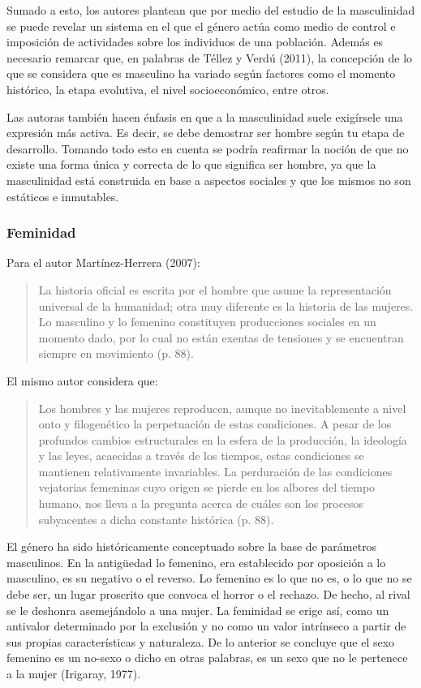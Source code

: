 Sumado a esto, los autores plantean que por medio del estudio de la masculinidad
se puede revelar un sistema en el que el género actúa como medio de control e
imposición de actividades sobre los individuos de una población.
Además es necesario remarcar que, en palabras de Téllez y Verdú (2011), la
concepción de lo que se considera que es masculino ha variado según factores
como el momento histórico, la etapa evolutiva, el nivel socioeconómico, entre
otros.

Las autoras también hacen énfasis en que a la masculinidad suele exigírsele una
expresión más activa.
Es decir, se debe demostrar ser hombre según tu etapa de desarrollo.
Tomando todo esto en cuenta se podría reafirmar la noción de que no existe una
forma única y correcta de lo que significa ser hombre, ya que la masculinidad
está construida en base a aspectos sociales y que los mismos no son estáticos e
inmutables.

\subsubsection{Feminidad}
Para el autor Martínez-Herrera (2007):

\begin{quote}
    La historia oficial es escrita por el hombre que asume la representación
    universal de la humanidad;
    otra muy diferente es la historia de las mujeres.
    Lo masculino y lo femenino constituyen producciones sociales en un momento dado,
    por lo cual no están exentas de tensiones y se encuentran siempre en movimiento
    (p. 88).
\end{quote}

El mismo autor considera que:

\begin{quote}
    Los hombres y las mujeres reproducen, aunque no inevitablemente a nivel onto y
    filogenético la perpetuación de estas condiciones.
    A pesar de los profundos cambios estructurales en la esfera de la producción, la
    ideología y las leyes, acaecidas a través de los tiempos, estas condiciones se
    mantienen relativamente invariables.
    La perduración de las condiciones vejatorias femeninas cuyo origen se pierde
    en los albores del tiempo humano, nos lleva a la pregunta acerca de cuáles son
    los procesos subyacentes a dicha constante histórica (p. 88).
\end{quote}

El género ha sido históricamente conceptuado sobre la base de parámetros
masculinos.
En la antigüedad lo femenino, era establecido por oposición a lo masculino, es
su negativo o el reverso.
Lo femenino es lo que no es, o lo que no se debe ser, un lugar proscrito que
convoca el horror o el rechazo.
De hecho, al rival se le deshonra asemejándolo a una mujer.
La feminidad se erige así, como un antivalor determinado por la exclusión y no
como un valor intrínseco a partir de sus propias características y naturaleza.
De lo anterior se concluye que el sexo femenino es un no-sexo o dicho en otras
palabras, es un sexo que no le pertenece a la mujer (Irigaray, 1977).

